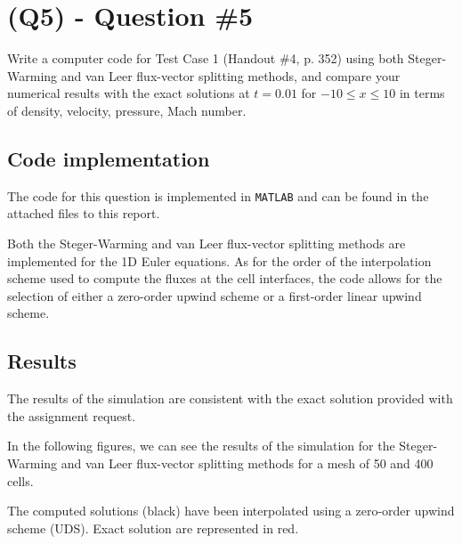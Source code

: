 \section{(Q5) - Question \#5}
\label{sec:Q5}

Write a computer code for Test Case 1 (Handout \#4, p. 352) using both Steger-Warming and van Leer flux-vector splitting methods, and compare your numerical results with the exact solutions at $t = 0.01 $ for $-10 \le x \le 10$ in terms of density, velocity, pressure, Mach number.


\subsection{Code implementation}

The code for this question is implemented in \texttt{MATLAB} and can be found in the attached files to this report.

Both the Steger-Warming and van Leer flux-vector splitting methods are implemented for the 1D Euler equations.
As for the order of the interpolation scheme used to compute the fluxes at the cell interfaces, the code allows for the selection of either a zero-order upwind scheme or a first-order linear upwind scheme.


% 

% 


\subsection{Results}

The results of the simulation are consistent with the exact solution provided with the assignment request.

In the following figures, we can see the results of the simulation for the Steger-Warming and van Leer flux-vector splitting methods for a mesh of 50 and 400 cells.

The computed solutions (black) have been interpolated using a zero-order upwind scheme (UDS).
Exact solution are represented in red.

